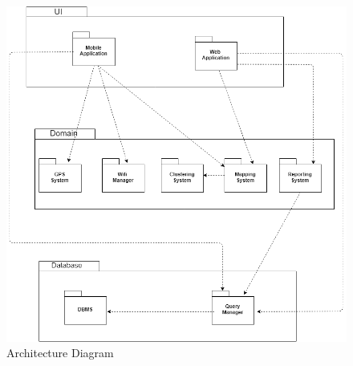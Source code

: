 \begin{figure}
	\centering
	\includegraphics[width=0.7\linewidth]{images/Architecture}
	\caption{Architecture Diagram}
	\label{fig:architecture}
\end{figure}

